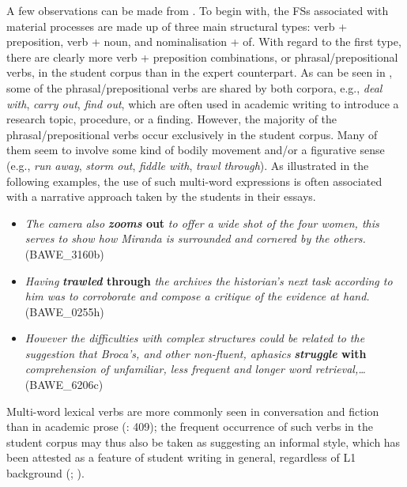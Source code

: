 A few observations can be made from . To begin with, the FSs associated with material processes are made up of three main structural types: verb + preposition, verb + noun, and nominalisation + of. With regard to the first type, there are clearly more verb + preposition combinations, or phrasal/prepositional verbs, in the student corpus than in the expert counterpart. As can be seen in , some of the phrasal/prepositional verbs are shared by both corpora, e.g., \textit{deal with}, \textit{carry out}, \textit{find out}, which are often used in academic writing to introduce a research topic, procedure, or a finding. However, the majority of the phrasal/prepositional verbs occur exclusively in the student corpus. Many of them seem to involve some kind of bodily movement and/or a figurative sense (e.g., \textit{run away}, \textit{storm out}, \textit{fiddle with}, \textit{trawl through}). As illustrated in the following examples, the use of such multi-word expressions is often associated with a narrative approach taken by the students in their essays. 

\begin{itemize}
\item \begin{styleListParagraph}
\textit{The camera also} \textbf{\textit{zooms} \textbf{out}} \textit{to offer a wide shot of the four women, this serves to show how Miranda is surrounded and cornered by the others.} (BAWE\_3160b)
\end{styleListParagraph}
\item \begin{styleListParagraph}
\textit{Having} \textbf{\textit{trawled} \textbf{through}} \textit{the archives the historian’s next task according to him was to corroborate and compose a critique of the evidence at hand.} (BAWE\_0255h)
\end{styleListParagraph}
\item \begin{styleListParagraph}
\textit{However the difficulties with complex structures could be related to the suggestion that Broca’s, and other non-fluent, aphasics} \textbf{\textit{struggle} \textbf{with}} \textit{comprehension of unfamiliar, less frequent and longer word retrieval,…} (BAWE\_6206c)
\end{styleListParagraph}
\end{itemize}

Multi-word lexical verbs are more commonly seen in conversation and fiction than in academic prose (\citealt{BiberEtAl1999}: 409); the frequent occurrence of such verbs in the student corpus may thus also be taken as suggesting an informal style, which has been attested as a feature of student writing in general, regardless of L1 background (\citealt{GrangerRayson1998}; \citealt{GilquinPaquot2008}). 

